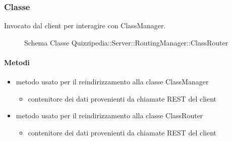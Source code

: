 \subsubsection{Classe }
Invocato dal client per interagire con ClassManager.
\begin{figure}[H]
\centering
\noindent{}
\caption[Schema Classe ClassRouter]{Schema Classe Quizzipedia::Server::RoutingManager::ClassRouter}
\end{figure}
\paragraph{Metodi}
\begin{itemize}
\item {}
\newline
metodo usato per il reindirizzamento alla classe ClassManager
\newline
{}
\newline
\begin{itemize}
\item {}
\newline
contenitore dei dati provenienti da chiamate REST del client
\end{itemize}
\item {}
\newline
metodo usato per il reindirizzamento alla classe ClassRouter
\newline
{}
\newline
\begin{itemize}
\item {}
\newline
contenitore dei dati provenienti da chiamate REST del client
\end{itemize}
\end{itemize}
